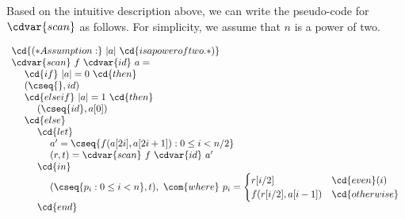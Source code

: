 \begin{cluster}
\label{grp:alg:design::contraction::scan}

\begin{algorithm}
\label{alg:design::contraction::scan}

Based on the intuitive description above, we can write the pseudo-code
for $\cdvar{scan}$ as  follows.
For simplicity, we assume that $n$ is a power of two.

\[
\begin{array}{l}
\cd{(* Assumption:}~|a|~\cd{is a power of two. *)}
\\
\cdvar{scan}~f~\cdvar{id}~a =
\\
~~~~\cd{if}~|a| = 0~\cd{then} 
\\
~~~~\left(\cseq{}, id\right)
\\
~~~~\cd{else if}~|a| = 1 ~\cd{then}
\\
~~~~~~~~\left( \cseq{id}, a[0] \right)
\\
~~~~\cd{else}
\\ 
~~~~~~~~\cd{let}
\\
~~~~~~~~~~~~a' = \cseq{ f(a[2i],a[2i+1]) : 0 \leq i < n/2}
\\
~~~~~~~~~~~~(r,t) = \cdvar{scan}~f~\cdvar{id}~ a'
\\
~~~~~~~~\cd{in}
\\ 
~~~~~~~~~~~~(\cseq{ p_i : 0 \leq i < n }, t),~\com{where}~p_i = 
\begin{cases}
     r[i/2]  & \cd{even}(i) \\
     f(r[i/2], a[i-1]) & \cd{otherwise}
\end{cases}
\\
~~~~~~~~\cd{end}
\end{array}
\]

\end{algorithm}
\end{cluster}

